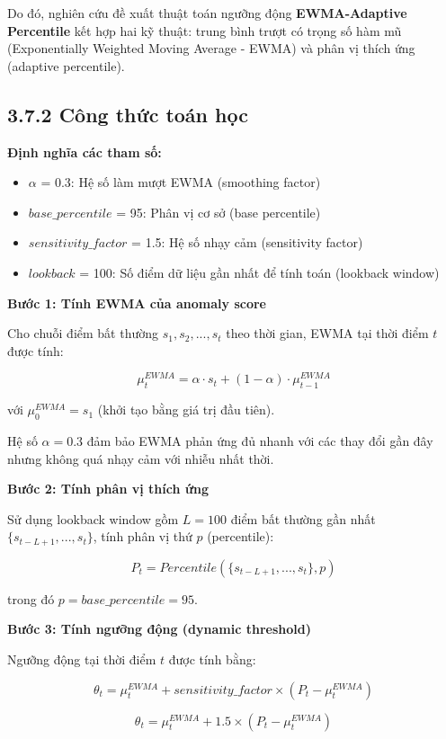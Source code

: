 \documentclass[
  a4paper]{report}
\providecommand{\tightlist}{%
  \setlength{\itemsep}{0pt}\setlength{\parskip}{0pt}}
\begin{document}
Do đó, nghiên cứu đề xuất thuật toán ngưỡng động \textbf{EWMA-Adaptive
Percentile} kết hợp hai kỹ thuật: trung bình trượt có trọng số hàm mũ
(Exponentially Weighted Moving Average - EWMA) và phân vị thích ứng
(adaptive percentile).

\subsection{3.7.2 Công thức toán
học}\label{cuxf4ng-thux1ee9c-touxe1n-hux1ecdc}

\textbf{Định nghĩa các tham số:}

\begin{itemize}
\tightlist
\item
  \(\alpha\) = 0.3: Hệ số làm mượt EWMA (smoothing factor)
\item
  \(base\_percentile\) = 95: Phân vị cơ sở (base percentile)
\item
  \(sensitivity\_factor\) = 1.5: Hệ số nhạy cảm (sensitivity factor)
\item
  \(lookback\) = 100: Số điểm dữ liệu gần nhất để tính toán (lookback
  window)
\end{itemize}

\textbf{Bước 1: Tính EWMA của anomaly score}

Cho chuỗi điểm bất thường \(s_1, s_2, ..., s_t\) theo thời gian, EWMA
tại thời điểm \(t\) được tính:

\[\mu_t^{EWMA} = \alpha \cdot s_t + (1 - \alpha) \cdot \mu_{t-1}^{EWMA}\]

với \(\mu_0^{EWMA} = s_1\) (khởi tạo bằng giá trị đầu tiên).

Hệ số \(\alpha = 0.3\) đảm bảo EWMA phản ứng đủ nhanh với các thay đổi
gần đây nhưng không quá nhạy cảm với nhiễu nhất thời.

\textbf{Bước 2: Tính phân vị thích ứng}

Sử dụng lookback window gồm \(L = 100\) điểm bất thường gần nhất
\(\{s_{t-L+1}, ..., s_t\}\), tính phân vị thứ \(p\) (percentile):

\[P_t = Percentile(\{s_{t-L+1}, ..., s_t\}, p)\]

trong đó \(p = base\_percentile = 95\).

\textbf{Bước 3: Tính ngưỡng động (dynamic threshold)}

Ngưỡng động tại thời điểm \(t\) được tính bằng:

\[\theta_t = \mu_t^{EWMA} + sensitivity\_factor \times (P_t - \mu_t^{EWMA})\]

\[\theta_t = \mu_t^{EWMA} + 1.5 \times (P_t - \mu_t^{EWMA})\]
\end{document}
